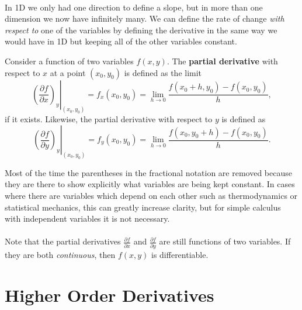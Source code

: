 \documentclass[../multivariate_calculus.tex]{subfiles}
\begin{document}
        \paragraph{}
        In 1D we only had one direction to define a slope, but in more than one dimension we now have infinitely many.
        We can define the rate of change \textit{with respect to} one of the variables by defining the derivative in the same way we would have in 1D but keeping all of the other variables constant.
        \begin{definition}
            Consider a function of two variables $f(x,y)$.
            The \textbf{partial derivative} with respect to $x$ at a point $(x_0,y_0)$ is defined as the limit
            \begin{equation}
                \left.\left(\frac{\partial f}{\partial x}\right)_y\right|_{(x_0,y_0)}=f_x(x_0,y_0)=\lim_{h\to 0}\frac{f(x_0+h,y_0)-f(x_0,y_0)}{h},
            \end{equation}
            if it exists.
            Likewise, the partial derivative with respect to $y$ is defined as
            \begin{equation}
                \left.\left(\frac{\partial f}{\partial y}\right)_y\right|_{(x_0,y_0)}=f_y(x_0,y_0)=\lim_{h\to 0}\frac{f(x_0,y_0+h)-f(x_0,y_0)}{h}.
            \end{equation}
        \end{definition}
        Most of the time the parentheses in the fractional notation are removed because they are there to show explicitly what variables are being kept constant.
        In cases where there are variables which depend on each other such as thermodynamics or statistical mechanics, this can greatly increase clarity, but for simple calculus with independent variables it is not necessary.

        \paragraph{}
        Note that the partial derivatives $\frac{\partial f}{\partial x}$ and $\frac{\partial f}{\partial y}$ are still functions of two variables.
        If they are both \textit{continuous}, then $f(x,y)$ is differentiable.

    \section{Higher Order Derivatives}
\end{document}
